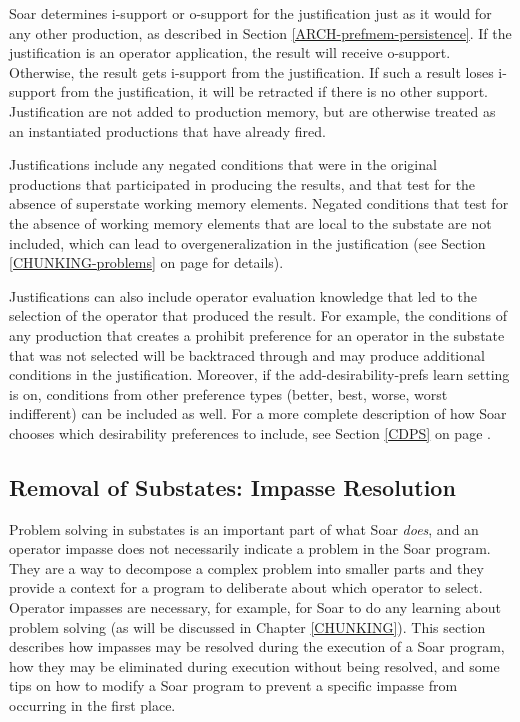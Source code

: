 Soar determines i-support or o-support for the justification just as it
would for any other production, as described in Section
\ref{ARCH-prefmem-persistence}.  If the justification is an operator
application, the result will receive o-support.  Otherwise, the result
gets i-support from the justification. If such a result loses
i-support from the justification, it will be retracted if there is no
other support.  Justification are not added to production memory, but
are otherwise treated as an instantiated productions that have already
fired.

Justifications include any negated conditions that were in the original
productions that participated in producing the results, and that test for the
absence of superstate working memory elements. Negated conditions that test for
the absence of working memory elements that are local to the substate are not
included, which can lead to overgeneralization in the justification (see Section
\ref{CHUNKING-problems} on page \pageref{CHUNKING-problems} for details).

Justifications can also include operator evaluation knowledge that led to the
selection of the operator that produced the result.  For example, the conditions
of any production that creates a prohibit preference for an operator in the substate that was not selected will be backtraced through
and may produce additional conditions in the justification.  Moreover, if the
add-desirability-prefs learn setting is on, conditions from other preference
types (better, best, worse, worst indifferent) can be included as well.  For a more
complete description of how Soar chooses which desirability preferences to
include, see Section \ref{CDPS} on page \pageref{CDPS}.

\subsection{Removal of Substates: Impasse Resolution}
\label{ARCH-impasses-elimination}

Problem solving in substates is an important part of what Soar
\textit{does}, and an operator impasse does not necessarily indicate a
problem in the Soar program.  They are a way to decompose a complex
problem into smaller parts and they provide a context for a program to
deliberate about which operator to select.  Operator impasses are necessary, for
example, for Soar to do any learning about problem solving (as will be
discussed in Chapter \ref{CHUNKING}). This section describes how
impasses may be resolved during the execution of a Soar program, how
they may be eliminated during execution without being resolved, and some
tips on how to modify a Soar program to prevent a specific impasse from
occurring in the first place.  

